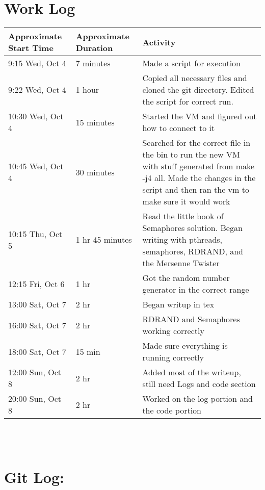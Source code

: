 \documentclass[10pt,drafclsnofoot,onecolumn]{article}
\begin{document}
\section{Work Log}
\begin{tabular}{|p{5cm}|p{5cm}|p{5cm}}
\textbf{Approximate Start Time} & \textbf{Approximate Duration} & \textbf{Activity} \\
\hline
9:15 Wed, Oct 4 & 7 minutes & Made a script for execution \\\hline
9:22 Wed, Oct 4 & 1 hour & Copied all necessary files and cloned the git directory. Edited the script for correct run. \\\hline
10:30 Wed, Oct 4 & 15 minutes & Started the VM and figured out how to connect to it \\\hline
10:45 Wed, Oct 4 & 30 minutes & Searched for the correct file in the bin to run the new VM with stuff generated from make -j4 all. Made the changes in the script and then ran the vm to make sure it would work \\
10:15 Thu, Oct 5 & 1 hr 45 minutes & Read the little book of Semaphores solution. Began writing with pthreads, semaphores, RDRAND, and the Mersenne Twister \\\hline
12:15 Fri, Oct 6 & 1 hr & Got the random number generator in the correct range \\\hline
13:00 Sat, Oct 7 & 2 hr & Began writup in tex \\\hline
16:00 Sat, Oct 7 & 2 hr & RDRAND and Semaphores working correctly \\\hline
18:00 Sat, Oct 7 & 15 min & Made sure everything is running correctly \\\hline
12:00 Sun, Oct 8 & 2 hr & Added most of the writeup, still need Logs and code section \\\hline
20:00 Sun, Oct 8 & 2 hr & Worked on the log portion and the code portion \\\hline
\end{tabular}
\\
\\
\section{Git Log:}
\end{document}

